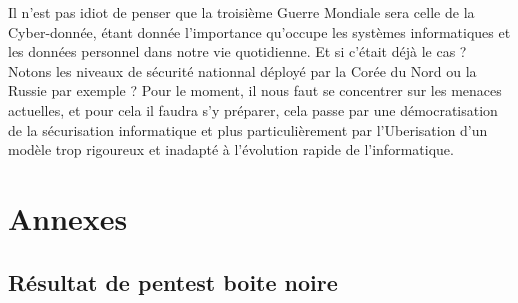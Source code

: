 \documentclass[a4paper]{memoir}
\begin{document}
Il n'est pas idiot de penser que la troisième Guerre Mondiale sera celle de la Cyber-donnée, étant donnée l'importance qu'occupe les systèmes informatiques et les données personnel dans notre vie quotidienne. Et si c'était déjà le cas ? Notons les niveaux de sécurité nationnal déployé par la Corée du Nord ou la Russie par exemple ? 
Pour le moment, il nous faut se concentrer sur les menaces actuelles, et pour cela il faudra s'y préparer, cela passe par une démocratisation de la sécurisation informatique et plus particulièrement par l'Uberisation d'un modèle trop rigoureux et inadapté à l'évolution rapide de l'informatique.


\part*{Annexes}
\appendix

\chapter{Résultat de pentest boite noire}


\backmatter%

\nocite{*}



\printindex
\end{document}

